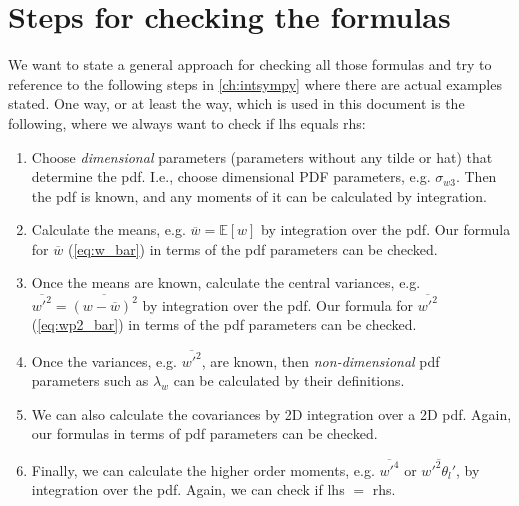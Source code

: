 \section{Steps for checking the formulas}\label{sec:steps_for_checking}

We want to state a general approach for checking all those formulas
and try to reference to the following steps in \cref{ch:intsympy} where there are actual examples stated.
One way, or at least the way, which is used in this document is the following,
where we always want to check if \gls{lhs} equals \gls{rhs}:

\begin{enumerate}
    \item\label{itm:checkingstep_1}
    Choose \emph{dimensional} parameters (parameters without any tilde or hat) that determine the \gls{pdf}.
    I.e., choose dimensional PDF parameters, e.g. $\sigma_{w 3}$.
    Then the \gls{pdf} is known, and any moments of it can be calculated by integration.

    \item\label{itm:checkingstep_2}
    Calculate the means, e.g. $\overline{w} = \mathbb{E}[w]$ by integration over the \gls{pdf}.
    Our formula for $\overline{w}$ (\cref{eq:w_bar}) in terms of the \gls{pdf} parameters can be checked.

    \item\label{itm:checkingstep_3}
    Once the means are known, calculate the central variances, e.g.  $\overline{w'^2} = \overline{(w-\overline{w})^2}$ by integration over the \gls{pdf}.
    Our formula for $\overline{w'^2}$ (\cref{eq:wp2_bar}) in terms of the \gls{pdf} parameters can be checked.

    \item\label{itm:checkingstep_4}
    Once the variances, e.g. $\overline{w'^2}$, are known, then \emph{non-dimensional} \gls{pdf} parameters such as $\lambda_w$ can be calculated by their definitions.

    \item\label{itm:checkingstep_5}
    We can also calculate the covariances by 2D integration over a 2D \gls{pdf}.
    Again, our formulas in terms of \gls{pdf} parameters can be checked.

    \item\label{itm:checkingstep_6}
    Finally, we can calculate the higher order moments, e.g. $\overline{w'^4}$ or $\overline{w'^2 \theta_l'}$, by integration over the \gls{pdf}.
    Again, we can check if \gls{lhs} $=$ \gls{rhs}.


\end{enumerate}
